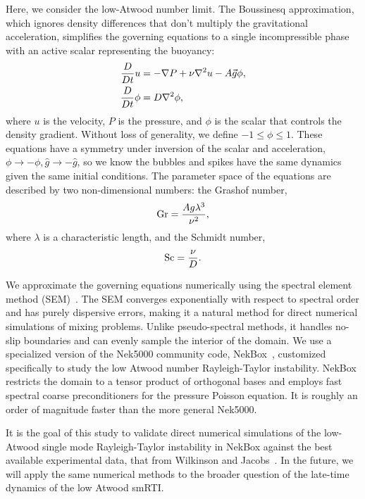 Here, we consider the low-Atwood number limit.
The Boussinesq approximation, which ignores density differences that don't multiply the gravitational acceleration, simplifies the governing equations to a single incompressible phase with an active scalar representing the buoyancy:
\begin{align} \elabel{boussinesq}
\frac{D}{D t} u &= - \nabla P + \nu \nabla^2 u - A \vec{g} \phi, \\
\frac{D}{Dt} \phi &= D \nabla^2 \phi, \nonumber
\end{align}
where $u$ is the velocity,
$P$ is the pressure, and 
$\phi$ is the scalar that controls the density gradient.
Without loss of generality, we define $-1 \le \phi \le 1$.
These equations have a symmetry under inversion of the scalar and acceleration, $\phi \rightarrow -\phi, \hat{g} \rightarrow -\hat{g}$, so we know the bubbles and spikes have the same dynamics given the same initial conditions.
The parameter space of the equations are described by two non-dimensional numbers: the Grashof number,
\begin{equation} \elabel{grashof}
\text{Gr} = \frac{A g \lambda^3}{\nu^2},
\end{equation}
where $\lambda$ is a characteristic length, and
the Schmidt number,
\begin{equation} \elabel{schmidt}
\text{Sc} = \frac{\nu}{D}.
\end{equation}

We approximate the governing equations numerically using the spectral element method (SEM)~\cite{Deville2002}.
The SEM converges exponentially with respect to spectral order and has purely dispersive errors, making it a natural method for direct numerical simulations of mixing problems.
Unlike pseudo-spectral methods, it handles no-slip boundaries and can evenly sample the interior of the domain.
We use a specialized version of the Nek5000 community code, NekBox~\cite{Hutchinsonb}, customized specifically to study the low Atwood number Rayleigh-Taylor instability.
NekBox restricts the domain to a tensor product of orthogonal bases and employs fast spectral coarse preconditioners for the pressure Poisson equation.
It is roughly an order of magnitude faster than the more general Nek5000.

It is the goal of this study to validate direct numerical simulations of the low-Atwood single mode Rayleigh-Taylor instability in NekBox against the best available experimental data, that from Wilkinson and Jacobs~\cite{Wilkinson2007}.
In the future, we will apply the same numerical methods to the broader question of the late-time dynamics of the low Atwood smRTI.

